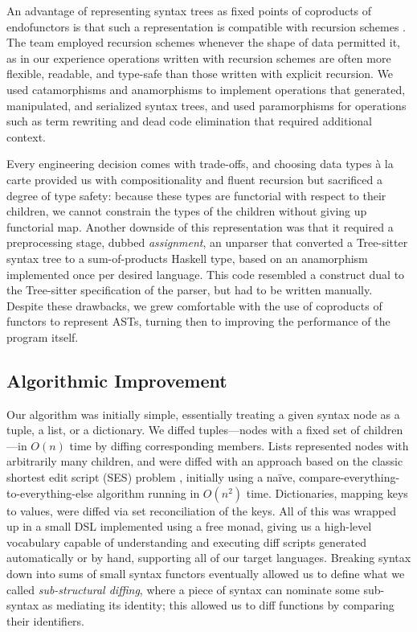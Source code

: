 \documentclass[acmsmall,fleqn,12pt]{acmart}
\begin{document}
An advantage of representing syntax trees as fixed points of coproducts of
endofunctors is that such a representation is compatible with recursion schemes
\cite{Meijer91Bananas}. The team employed recursion schemes whenever the shape
of data permitted it, as in our experience operations written with recursion schemes
are often more flexible, readable, and type-safe than those written with
explicit recursion. We used catamorphisms and anamorphisms to implement
operations that generated, manipulated, and serialized syntax trees, and used
paramorphisms for operations such as term rewriting and dead code elimination
that required additional context.

Every engineering decision comes with trade-offs, and choosing data types à
la carte provided us with compositionality and fluent recursion but
sacrificed a degree of type safety: because these types are functorial with
respect to their children, we cannot constrain the types of the children
without giving up functorial map. Another downside of this representation
was that it required a preprocessing stage, dubbed \emph{assignment}, an
unparser that converted a Tree-sitter syntax tree to a sum-of-products
Haskell type, based on an anamorphism implemented once per desired language.
This code resembled a construct dual to the Tree-sitter specification of the
parser, but had to be written manually. Despite these drawbacks, we grew
comfortable with the use of coproducts of functors to represent ASTs,
turning then to improving the performance of the program itself.

\subsection{Algorithmic Improvement}

Our algorithm was initially simple, essentially treating a given syntax node as
a tuple, a list, or a dictionary. We diffed tuples—nodes with a fixed set of
children—in $O(n)$ time by diffing corresponding members. Lists represented
nodes with arbitrarily many children, and were diffed with an approach based on
the classic shortest edit script (SES) problem \cite{Myers86Diff}, initially
using a naïve, compare-everything-to-everything-else algorithm running in
$O(n^2)$ time. Dictionaries, mapping keys to values, were diffed via set
reconciliation of the keys. All of this was wrapped up in a small DSL
implemented using a free monad, giving us a high-level vocabulary capable of
understanding and executing diff scripts generated automatically or by hand,
supporting all of our target languages. Breaking syntax down into sums of small
syntax functors eventually allowed us to define what we called
\emph{sub-structural diffing}, where a piece of syntax can nominate some
sub-syntax as mediating its identity; this allowed us to diff functions by
comparing their identifiers.
\end{document}
